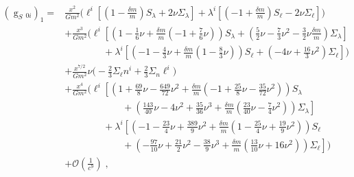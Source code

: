 \begin{align}
\left(\mathop{g}_{S}{}_{0i}\right)_1=
&\frac{x^2}{G m^2}\Bigg(
\ell^i \left[\left(1 -\frac{\delta m}{m}\right)S_{\lambda }+2 \nu\Sigma _{\lambda }\right]
+\lambda^i\left[\left(-1 +\frac{\delta m}{m}\right)S_\ell-2 \nu\Sigma _\ell\right]
\Bigg)\nonumber\\
&+\frac{x^3}{G m^2}\Bigg(
\ell^i \left[\left(1 -\frac{1}{6} \nu+\frac{\delta m}{m}\left(-1 + \frac{7}{6} \nu\right)\right)S_{\lambda }+\left(\frac{5}{2} \nu -\frac{7}{3} \nu^2 -\frac{3}{2} \nu\frac{\delta m}{m}\right)\Sigma _{\lambda }\right]\nonumber\\
&\qquad\qquad
+\lambda^i\left[\left(-1 -\frac{4}{3} \nu+\frac{\delta m}{m}\left(1 -\frac{8}{3} \nu\right)\right)S_\ell+\left(-4 \nu + \frac{16}{3} \nu^2\right)\Sigma _\ell\right]\Bigg)\nonumber\\
&+\frac{x^{7/2}}{G m^2}\nu \Bigg(-\frac{2}{3} \Sigma _\ell  n^{i} + \frac{2}{3}   \Sigma _n \ell^{i}\Bigg)\nonumber\\
&+\frac{x^4}{G m^2}\Bigg(
\ell^i \left[\left(1 + \frac{69}{8} \nu -\frac{649}{72} \nu^2+\frac{\delta m}{m}\left(-1 + \frac{25}{8} \nu -\frac{35}{72} \nu^2\right)\right)S_{\lambda }\right.\nonumber\\
&\qquad\qquad\qquad+\left.\left(\frac{143}{40} \nu -4 \nu^2 + \frac{35}{36} \nu^3+\frac{\delta m}{m}\left(\frac{23}{40} \nu -\frac{7}{4} \nu^2\right)\right)\Sigma _{\lambda }\right]\nonumber\\
&\qquad\qquad
+\lambda^i\left[\left(-1 -\frac{23}{4} \nu + \frac{389}{9} \nu^2+\frac{\delta m}{m}\left(1 -\frac{25}{4} \nu + \frac{19}{9} \nu^2\right)\right)S_\ell\right.\nonumber\\
&\qquad\qquad\qquad+\left.\left(-\frac{97}{10} \nu + \frac{21}{2} \nu^2 -\frac{38}{9} \nu^3+\frac{\delta m}{m}\left(\frac{13}{10} \nu + 16 \nu^2\right)\right)\Sigma _\ell\right]\Bigg)\nonumber\\
&+\mathcal{O}\left(\frac{1}{c^9}\right) \;,
\end{align}
